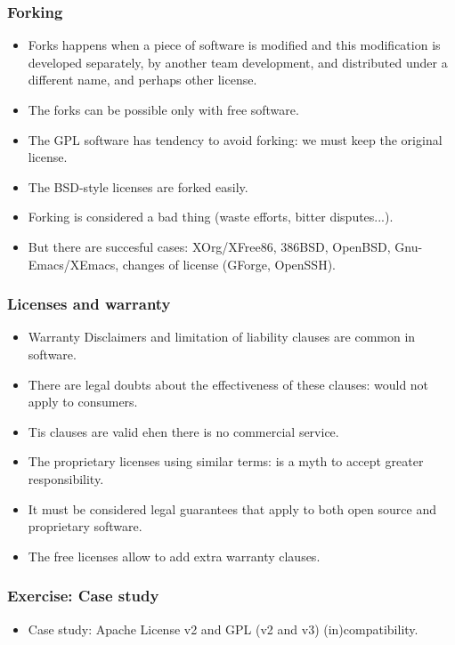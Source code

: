 \begin{frame}
\frametitle{Forking}

\begin{itemize}
\item Forks happens when a piece of software is modified and this modification is developed separately, by another team development, and distributed under a different name, and perhaps other
license.
\item The forks can be possible only with free software.
\item The GPL software has tendency to avoid forking: we must keep the original license.
\item The BSD-style licenses are forked easily.
\item Forking is considered a bad thing (waste efforts, bitter disputes...).
\item But there are succesful cases: XOrg/XFree86, 386BSD, OpenBSD, Gnu-Emacs/XEmacs, changes of license (GForge, OpenSSH).
\end{itemize}


\end{frame}



\begin{frame}
\frametitle{Licenses and warranty}

\begin{itemize}
\item Warranty Disclaimers and limitation of liability clauses are common in software.
\item There are legal doubts about the effectiveness of these clauses: would not apply to consumers.
\item Tis clauses are valid ehen there is no commercial service.
\item The proprietary licenses using similar terms: is a myth to accept greater responsibility.
\item It must be considered legal guarantees that apply to both open source and proprietary software.
\item The free licenses allow to add extra warranty clauses.

\end{itemize}


\end{frame}


\begin{frame}
\frametitle{Exercise: Case study}


\begin{itemize}
\item Case study: Apache License v2 and GPL (v2 and v3)  (in)compatibility.
\end{itemize}

\end{frame}


